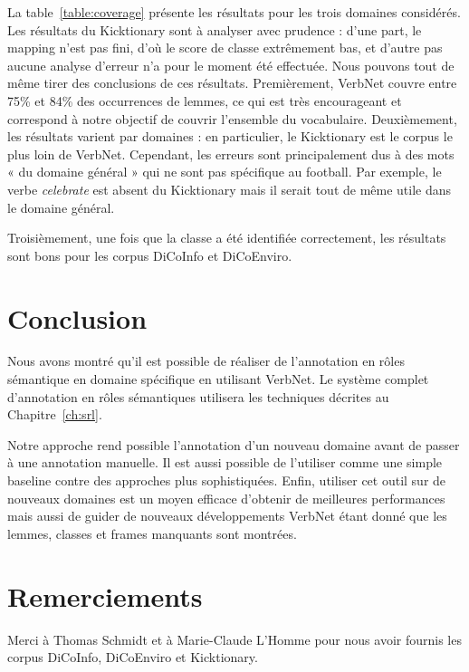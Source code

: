 La table~\ref{table:coverage} présente les résultats pour les trois domaines
considérés. Les résultats du Kicktionary sont à analyser avec prudence : d'une
part, le mapping n'est pas fini, d'où le score de classe extrêmement bas, et
d'autre pas aucune analyse d'erreur n'a pour le moment été effectuée. Nous
pouvons tout de même tirer des conclusions de ces résultats. Premièrement,
VerbNet couvre entre 75\% et 84\% des occurrences de lemmes, ce qui est très
encourageant et correspond à notre objectif de couvrir l'ensemble du
vocabulaire.
Deuxièmement, les résultats varient par domaines : en particulier, le
Kicktionary est le corpus le plus loin de VerbNet. Cependant, les erreurs sont
principalement dus à des mots « du domaine général » qui ne sont pas spécifique
au football. Par exemple, le verbe \emph{celebrate} est absent du Kicktionary
mais il serait tout de même utile dans le domaine général.

Troisièmement, une fois que la classe a été identifiée correctement, les
résultats sont bons pour les corpus DiCoInfo et DiCoEnviro.

\section{Conclusion}

Nous avons montré qu'il est possible de réaliser de l'annotation en rôles
sémantique en domaine spécifique en utilisant VerbNet. Le système complet
d'annotation en rôles sémantiques utilisera les techniques décrites au
Chapitre~\ref{ch:srl}.

Notre approche rend possible l'annotation d'un nouveau domaine avant de passer
à une annotation manuelle. Il est aussi possible de l'utiliser comme une simple
baseline contre des approches plus sophistiquées. Enfin, utiliser cet outil sur
de nouveaux domaines est un moyen efficace d'obtenir de meilleures performances
mais aussi de guider de nouveaux développements VerbNet étant donné que les
lemmes, classes et frames manquants sont montrées.

\section*{Remerciements}

Merci à Thomas Schmidt et à Marie-Claude L'Homme pour nous avoir fournis les
corpus DiCoInfo, DiCoEnviro et Kicktionary.
